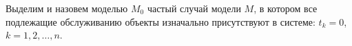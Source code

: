\begin{ptkarticle}
Выделим и назовем моделью $M_0$ частый случай модели $M$, в котором все подлежащие обслуживанию объекты изначально присутствуют в системе: $t_k=0$, $k=1,2,…,n$.




\end{ptkarticle}
